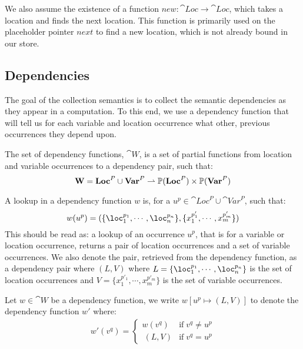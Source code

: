 \documentclass[../../master.tex]{subfiles}
\begin{document}
We also assume the existence of a function $new:\cat{Loc}\rightarrow\cat{Loc}$, which takes a location and finds the next location.
This function is primarily used on the placeholder pointer $next$ to find a new location, which is not already bound in our store.



\subsection{Dependencies}\label{sec:DepFunc}
The goal of the collection semantics is to collect the semantic dependencies as they appear in a computation. To this end, we use a dependency function that will tell us for each variable and location occurrence what other, previous occurrences they depend upon.

\begin{definition}\label{def:DepFunc}
	The set of dependency functions, $\cat{W}$, is a set of partial functions from location and variable occurrences to a dependency pair, such that:
	$$\textbf{W}=\textbf{Loc}^P\cup\textbf{Var}^P\rightharpoonup\mathbb{P}(\textbf{Loc}^P)\times\mathbb{P}(\textbf{Var}^P)$$
\end{definition}
A lookup in a dependency function $w$ is, for a $u^p\in\cat{Loc}^P\cup\cat{Var}^P$, such that:
$$w(u^p)=(\{\loc_1^{p_1},\cdots,\loc_n^{p_n}\},\{x_1^{p'_1},\cdots,x_m^{p'_m}\})$$
This should be read as: a lookup of an occurrence $u^p$, that is for a variable or location occurrence, returns a pair of location occurrences and a set of variable occurrences.
We also denote the pair, retrieved from the dependency function, as a dependency pair where $(L,V)$ where $L=\{\loc_1^{p_1},\cdots,\loc_n^{p_n}\}$ is the set of location occurrences and $V=\{x_1^{p'_1},\cdots,x_m^{p'_m}\}$ is the set of variable occurrences.

\begin{definition}[Update of $w$]\label{def:DepExt}
	Let $w\in\cat{W}$ be a dependency function, we write $w[u^p\mapsto(L,V)]$ to denote the dependency function $w'$ where:
	\begin{align*}
		w'(v^q)=
		\left\{\begin{matrix}
			w(v^q) & \mbox{if}\;v^q\neq u^p\\\	 
			(L,V) & \mbox{if}\;v^q=u^p
		\end{matrix}\right.
	\end{align*}
\end{definition}
\end{document}
